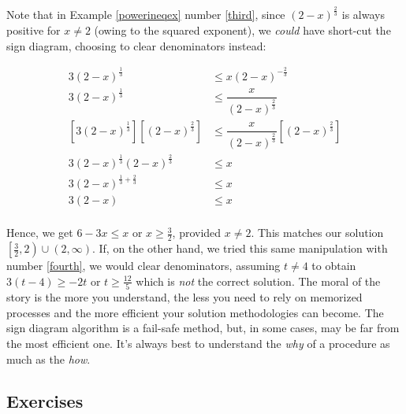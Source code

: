 Note that in Example \ref{powerineqex} number \ref{third}, since $(2-x)^{\frac{2}{3}}$ is always positive  for $x \neq 2$ (owing to the squared exponent), we \textit{could} have short-cut the sign diagram, choosing to  clear denominators instead:

\begin{align*}
3 (2-x)^{\frac{1}{3}} & \leq x (2-x)^{-\frac{2}{3}} \\
3 (2-x)^{\frac{1}{3}} & \leq \dfrac{x}{(2-x)^{\frac{2}{3}}} \\
\left[3 (2-x)^{\frac{1}{3}} \right] \left[  (2-x)^{\frac{2}{3}}\right]& \leq \dfrac{x}{(2-x)^{\frac{2}{3}}}  \left[  (2-x)^{\frac{2}{3}}\right] \tag{provided $x \neq 2$} \\
3 (2-x)^{\frac{1}{3}} (2-x)^{\frac{2}{3}} & \leq x \\
3 (2-x)^{\frac{1}{3}+\frac{2}{3}} & \leq x \\
3(2-x) & \leq x  \\
\end{align*}

Hence, we get $6-3x \leq x$ or $x \geq \frac{3}{2}$, provided $x \neq 2$. This matches our solution $\left[\frac{3}{2},2\right) \cup (2, \infty)$.  If, on the other hand, we tried this same manipulation with number \ref{fourth}, we would clear denominators, assuming $t \neq 4$ to obtain $3(t-4) \geq -2t$ or $t \geq \frac{12}{5}$ which is \textit{not} the correct solution.  The moral of the story is the more you understand, the less you need to rely on memorized processes and the more efficient your solution methodologies can become.  The sign diagram algorithm is a fail-safe method, but, in some cases, may be far from the most efficient one.  It's always best to understand the \textit{why} of a procedure as much as the \textit{how}.  

\clearpage

\subsection{Exercises}



\closegraphsfile